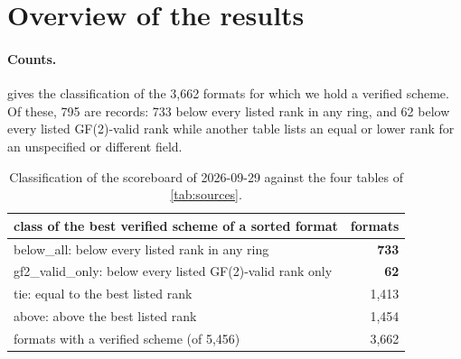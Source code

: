 \section{Overview of the results}\label{sec:overview}

\paragraph{Counts.}
 gives the classification of the 3{,}662 formats for which we hold a verified scheme. Of these, 795 are records: 733 below every listed rank in any ring, and 62 below every listed GF(2)-valid rank while another table lists an equal or lower rank for an unspecified or different field.
\begin{table}[t]
\centering\small
\begin{tabular}{@{}lr@{}}
\toprule
class of the best verified scheme of a sorted format & formats\\
\midrule
\textsf{below\_all}: below every listed rank in any ring & \textbf{733}\\
\textsf{gf2\_valid\_only}: below every listed GF(2)-valid rank only & \textbf{62}\\
\textsf{tie}: equal to the best listed rank & 1{,}413\\
\textsf{above}: above the best listed rank & 1{,}454\\
\midrule
formats with a verified scheme (of 5{,}456) & 3{,}662\\
\bottomrule
\end{tabular}
\caption{Classification of the scoreboard of 2026-09-29 against the four tables of \cref{tab:sources}.}
\label{tab:classes}
\end{table}

